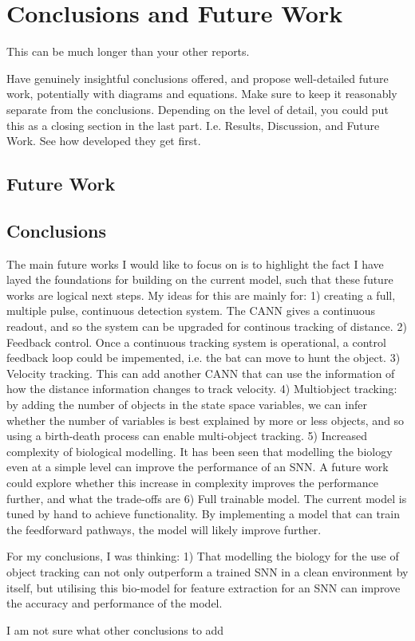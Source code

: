 \chapter{Conclusions and Future Work}

This can be much longer than your other reports.

Have genuinely insightful conclusions offered, and propose well-detailed future work, potentially with diagrams and equations. Make sure to keep it reasonably separate from the conclusions. Depending on the level of detail, you could put this as a closing section in the last part. I.e. Results, Discussion, and Future Work. See how developed they get first.

\section{Future Work}

\section{Conclusions}



The main future works I would like to focus on is to highlight the fact I have layed the foundations for building on the current model, such that these future works are logical next steps. 
My ideas for this are mainly for:
1) creating a full, multiple pulse, continuous detection system. The CANN gives a continuous readout, and so the system can be upgraded for continous tracking of distance. 
2) Feedback control. Once a continuous tracking system is operational, a control feedback loop could be impemented, i.e. the bat can move to hunt the object.
3) Velocity tracking. This can add another CANN that can use the information of how the distance information changes to track velocity.
4) Multiobject tracking: by adding the number of objects in the state space variables, we can infer whether the number of variables is best explained by more or less objects, and so using a birth-death process can enable multi-object tracking.
5) Increased complexity of biological modelling. It has been seen that modelling the biology even at a simple level can improve the performance of an SNN. A future work could explore whether this increase in complexity improves the performance further, and what the trade-offs are
6) Full trainable model. The current model is tuned by hand to achieve functionality. By implementing a model that can train the feedforward pathways, the model will likely improve further.


For my conclusions, I was thinking:
1) That modelling the biology for the use of object tracking can not only outperform a trained SNN in a clean environment by itself, but utilising this bio-model for feature extraction for an SNN can improve the accuracy and performance of the model.

I am not sure what other conclusions to add
